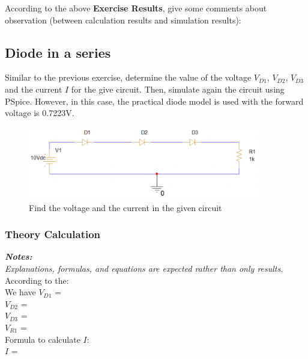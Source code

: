 According to the above \textbf{Exercise Results}, give some comments about observation (between calculation results and simulation results):\dotfill\bigskip
\dotfill\bigskip\par\mbox{}\dotfill
\dotfill\bigskip\par\mbox{}\dotfill
\dotfill\bigskip\par\mbox{}\dotfill
\dotfill\bigskip\par\mbox{}\dotfill

\subsection{Diode in a series}
Similar to the previous exercise, determine the value of the voltage $V_{D1}$, $V_{D2}$, $V_{D3}$ and the current $I$ for the give circuit. Then, simulate again the circuit using PSpice. However, in this case, the practical diode model is used with the forward voltage is 0.7223V.\\

\begin{figure}[!htp]
    \centering
    \includegraphics[width = 4in]{source/picture/bai_2/Lab02_Ex_02.png}
    \caption{Find the voltage and the current in the given circuit}
    \label{lab02_ex02}
\end{figure}


\subsubsection{Theory Calculation}
\textit{\textbf{Notes:}}\\
\textit{Explanations, formulas, and equations are expected rather than only results.}\\

According to the:\dotfill\bigskip\\
We have $V_{D1}$ =\dotfill\bigskip\\
$V_{D2}$ =\dotfill\bigskip\\
$V_{D3}$ =\dotfill\bigskip\\
$V_{R1}$ = \dotfill\bigskip\\
Formula to calculate $I$: \dotfill\bigskip\\
$I$ = \dotfill\bigskip\\




